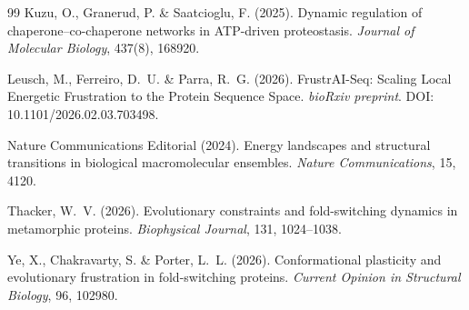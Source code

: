 \documentclass[12pt,a4paper]{article}
\theoremstyle{remark}
\begin{document}
\begin{thebibliography}{99}
Kuzu, O., Granerud, P. \& Saatcioglu, F. (2025).
\newblock Dynamic regulation of chaperone--co-chaperone networks in ATP-driven proteostasis.
\newblock \textit{Journal of Molecular Biology}, 437(8), 168920.

Leusch, M., Ferreiro, D.~U. \& Parra, R.~G. (2026).
\newblock FrustrAI-Seq: Scaling Local Energetic Frustration to the Protein Sequence Space.
\newblock \textit{bioRxiv preprint}.
\newblock DOI: 10.1101/2026.02.03.703498.

Nature Communications Editorial (2024).
\newblock Energy landscapes and structural transitions in biological macromolecular ensembles.
\newblock \textit{Nature Communications}, 15, 4120.

Thacker, W.~V. (2026).
\newblock Evolutionary constraints and fold-switching dynamics in metamorphic proteins.
\newblock \textit{Biophysical Journal}, 131, 1024--1038.

Ye, X., Chakravarty, S. \& Porter, L.~L. (2026).
\newblock Conformational plasticity and evolutionary frustration in fold-switching proteins.
\newblock \textit{Current Opinion in Structural Biology}, 96, 102980.

\end{thebibliography}
\end{document}
